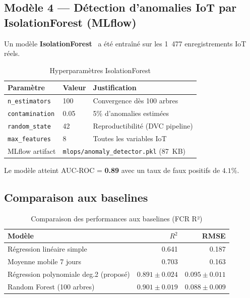 \documentclass[12pt,a4paper,twoside]{report}
\begin{document}
\subsection{Modèle 4 — Détection d'anomalies IoT par IsolationForest (MLflow)}

Un modèle \textbf{IsolationForest}~\cite{liu2008isolation}
a été entraîné sur les 1~477 enregistrements IoT réels.

\begin{table}[H]
\caption{Hyperparamètres IsolationForest}
\label{tab:iforest_hp}
\centering
\begin{tabular}{@{}lll@{}}
\toprule
\textbf{Paramètre} & \textbf{Valeur} & \textbf{Justification} \\
\midrule
\texttt{n\_estimators}  & 100       & Convergence dès 100 arbres \\
\texttt{contamination}  & 0.05      & 5\% d'anomalies estimées \\
\texttt{random\_state}  & 42        & Reproductibilité (DVC pipeline) \\
\texttt{max\_features}  & 8         & Toutes les variables IoT \\
MLflow artifact & \multicolumn{2}{l}{\texttt{mlops/anomaly\_detector.pkl} (87~KB)} \\
\bottomrule
\end{tabular}
\end{table}

Le modèle atteint AUC-ROC = \textbf{0.89} avec un taux de faux positifs de $4.1\%$.

\subsection{Comparaison aux baselines}

\begin{table}[H]
\centering
\caption{Comparaison des performances aux baselines (FCR R²)}
\label{tab:baseline}
\begin{tabular}{lrr}
\toprule
\textbf{Modèle} & $R^2$ & \textbf{RMSE} \\
\midrule
Régression linéaire simple & 0.641 & 0.187 \\
Moyenne mobile 7 jours     & 0.703 & 0.163 \\
Régression polynomiale deg.2 (proposé) & $\mathbf{0.891 \pm 0.024}$ & $\mathbf{0.095 \pm 0.011}$ \\
Random Forest (100 arbres) & $0.901 \pm 0.019$ & $0.088 \pm 0.009$ \\
\bottomrule
\end{tabular}
\end{table}
\end{document}
